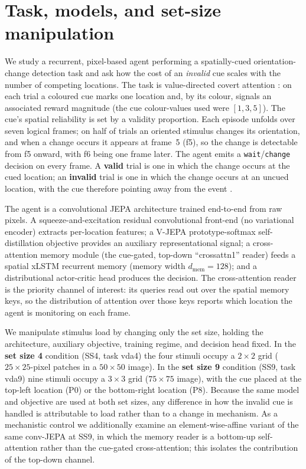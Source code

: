 \section{Task, models, and set-size manipulation}

We study a recurrent, pixel-based agent performing a spatially-cued orientation-change detection task and ask how the cost of an \emph{invalid} cue scales with the number of competing locations. The task is value-directed covert attention \citep{luo2019attention,carrasco2011visual}: on each trial a coloured cue marks one location and, by its colour, signals an associated reward magnitude (the cue colour-values used were $[1,3,5]$). The cue's spatial reliability is set by a validity proportion. Each episode unfolds over seven logical frames; on half of trials an oriented stimulus changes its orientation, and when a change occurs it appears at frame~5 (f5), so the change is detectable from f5 onward, with f6 being one frame later. The agent emits a \texttt{wait}/\texttt{change} decision on every frame. A \textbf{valid} trial is one in which the change occurs at the cued location; an \textbf{invalid} trial is one in which the change occurs at an uncued location, with the cue therefore pointing away from the event \citep{posner1980attention,posner1994visual}.

The agent is a convolutional JEPA architecture trained end-to-end from raw pixels. A squeeze-and-excitation residual convolutional front-end (no variational encoder) extracts per-location features; a V-JEPA prototype-softmax self-distillation objective provides an auxiliary representational signal; a cross-attention memory module (the cue-gated, top-down ``crossattn1'' reader) feeds a spatial xLSTM recurrent memory (memory width $d_{\mathrm{mem}}=128$); and a distributional actor-critic head produces the decision. The cross-attention reader is the priority channel of interest: its queries read out over the spatial memory keys, so the distribution of attention over those keys reports which location the agent is monitoring on each frame.

We manipulate stimulus load by changing only the set size, holding the architecture, auxiliary objective, training regime, and decision head fixed. In the \textbf{set size 4} condition (SS4, task vda4) the four stimuli occupy a $2\times2$ grid ($25\times25$-pixel patches in a $50\times50$ image). In the \textbf{set size 9} condition (SS9, task vda9) nine stimuli occupy a $3\times3$ grid ($75\times75$ image), with the cue placed at the top-left location (P0) or the bottom-right location (P8). Because the same model and objective are used at both set sizes, any difference in how the invalid cue is handled is attributable to load rather than to a change in mechanism. As a mechanistic control we additionally examine an element-wise-affine variant of the same conv-JEPA at SS9, in which the memory reader is a bottom-up self-attention rather than the cue-gated cross-attention; this isolates the contribution of the top-down channel.

